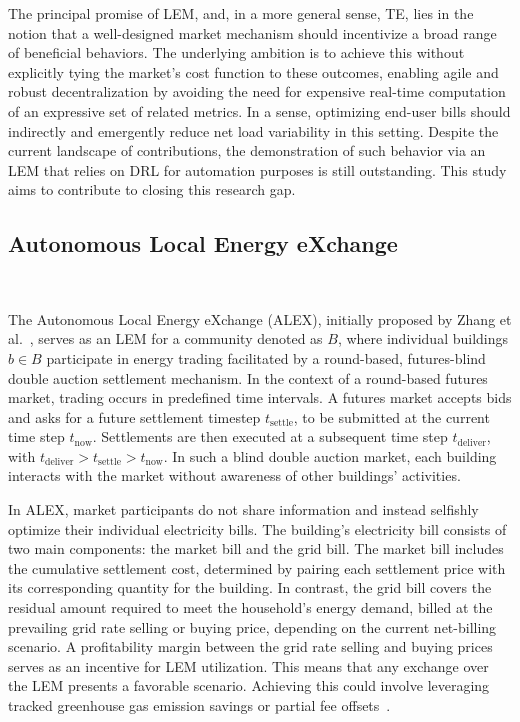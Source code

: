 \documentclass[preprint, 12pt]{elsarticle}
\newcommand{\now}{\text{now}}
\newcommand{\stl}{\text{settle}}
\newcommand{\dlv}{\text{deliver}}
\begin{document}
The principal promise of LEM, and, in a more general sense, TE, lies in the notion that a well-designed market mechanism should incentivize a broad range of beneficial behaviors. The underlying ambition is to achieve this without explicitly tying the market's cost function to these outcomes, enabling agile and robust decentralization by avoiding the need for expensive real-time computation of an expressive set of related metrics. In a sense, optimizing end-user bills should indirectly and emergently reduce net load variability in this setting. Despite the current landscape of contributions, the demonstration of such behavior via an LEM that relies on DRL for automation purposes is still outstanding. This study aims to contribute to closing this research gap.

\subsection{Autonomous Local Energy eXchange}~\label{subsec: ALEX}

The Autonomous Local Energy eXchange (ALEX), initially proposed by Zhang et al.~\cite{ALEXV1}, serves as an LEM for a community denoted as $B$, where individual buildings $b \in B$ participate in energy trading facilitated by a round-based, futures-blind double auction settlement mechanism. In the context of a round-based futures market, trading occurs in predefined time intervals. A futures market accepts bids and asks for a future settlement timestep $t_{\stl}$, to be submitted at the current time step $t_{\now}$. Settlements are then executed at a subsequent time step $t_{\dlv}$, with $t_{\dlv} > t_{\stl} > t_{\now}$. In such a blind double auction market, each building interacts with the market without awareness of other buildings' activities.
 
In ALEX, market participants do not share information and instead selfishly optimize their individual electricity bills. The building's electricity bill consists of two main components: the market bill and the grid bill. The market bill includes the cumulative settlement cost, determined by pairing each settlement price with its corresponding quantity for the building. In contrast, the grid bill covers the residual amount required to meet the household's energy demand, billed at the prevailing grid rate selling or buying price, depending on the current net-billing scenario. A profitability margin between the grid rate selling and buying prices serves as an incentive for LEM utilization. This means that any exchange over the LEM presents a favorable scenario. Achieving this could involve leveraging tracked greenhouse gas emission savings or partial fee offsets~\cite{CAPPER_LEM_Review, Dudjak_LEM_Review}.
\end{document}
